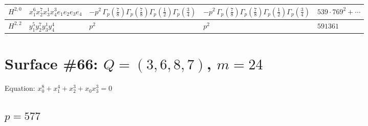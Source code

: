 \documentclass[11pt]{article}
\begin{document}
\begin{table}[ht]
{\begin{tabular}{@{}lllll@{}}
\midrule
$H^{2,0}$ & $x_{1}^{6} x_{2}^{7} x_{3}^{1} x_{4}^{3}  e_{1} e_{2} e_{3} e_{4}$ & $- p^{2} \, \Gamma_p \left( \frac{7}{8} \right) \Gamma_p \left( \frac{7}{8} \right) \Gamma_p \left( \frac{1}{2} \right) \Gamma_p \left( \frac{3}{4} \right)$ & $- p^{2} \, \Gamma_p \left( \frac{7}{8} \right) \Gamma_p \left( \frac{7}{8} \right) \Gamma_p \left( \frac{1}{2} \right) \Gamma_p \left( \frac{3}{4} \right)$ & $539{\cdot}769^{2}{+}\cdots$ \\
\midrule
$H^{2,2}$ & $y_{1}^{5} y_{2}^{7} y_{3}^{1} y_{4}^{4}$ & $p^{2} \,$ & $p^{2} \,$ & $591361$ \\
\bottomrule
\end{tabular}
}
\renewcommand{\arraystretch}{1.0}
\end{table}

\newpage

\section*{Surface \#66: $Q=(3, 6, 8, 7)$, $m=24$}

Equation: $x_0^{8} + x_1^{4} + x_2^{3} + x_0 x_3^{3} = 0$

\subsection*{$p = 577$}
\end{document}
